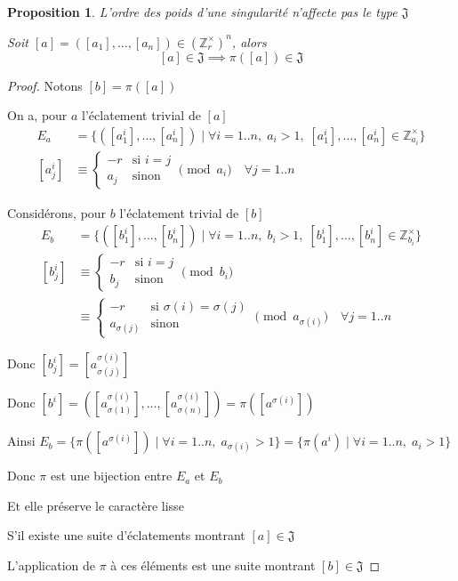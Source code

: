\documentclass{article}
\newtheorem{proposition}{Proposition}
\begin{document}
\begin{proposition}
    L'ordre des poids d'une singularité n'affecte pas le type $\mathfrak{J}$

    Soit $[a]=([a_1], \dots, [a_n]) \in (\mathbb{Z}_r^\times)^n$, alors
    \[ [a] \in \mathfrak{J} \implies \pi([a]) \in \mathfrak{J} \]
\end{proposition}

\begin{proof}
    Notons $[b] = \pi([a])$

    On a, pour $a$ l'éclatement trivial de $[a]$ 
    \begin{align*}
        E_a & = \{ ([a^i_1], \dots, [a^i_n]) \mid \forall i = 1..n,\; a_i > 1,\; [a_1^i], \dots, [a_n^i] \in \mathbb{Z}_{a_i}^\times \} \\
        [a_j^i] &\equiv \begin{cases}
                -r &\text{si } i = j \\
                a_j &\text{sinon}
            \end{cases} \pmod{a_i} \quad \forall j = 1..n
    \end{align*}

    Considérons, pour $b$ l'éclatement trivial de $[b]$
    \begin{align*}
        E_b & = \{ ([b^i_1], \dots, [b^i_n]) \mid \forall i = 1..n,\; b_i > 1,\; [b_1^i], \dots, [b_n^i] \in \mathbb{Z}_{b_i}^\times\} \\
        [b_j^i] & \equiv \begin{cases}
                        -r &\text{si } i = j \\
                        b_j &\text{sinon}
                    \end{cases} \pmod{b_i} \\
            & \equiv \begin{cases}
                -r &\text{si } \sigma(i) = \sigma(j) \\
                a_{\sigma(j)} &\text{sinon}
            \end{cases} \pmod {a_{\sigma(i)}} \quad \forall j = 1..n
    \end{align*}

    Donc $[b_j^i] = [a_{\sigma(j)}^{\sigma(i)}]$

    Donc $[b^i] = ([a_{\sigma(1)}^{\sigma(i)}], \dots, [a_{\sigma(n)}^{\sigma(i)}]) = \pi([a^{\sigma(i)}])$

    Ainsi $E_b = \{ \pi([a^{\sigma(i)}]) \mid \forall i = 1..n,\; a_{\sigma(i)} > 1 \} = \{ \pi(a^i) \mid \forall i = 1..n,\; a_i > 1\}$

    Donc $\pi$ est une bijection entre $E_a$ et $E_b$

    Et elle préserve le caractère lisse

    S'il existe une suite d'éclatements montrant $[a] \in \mathfrak{J}$

    L'application de $\pi$ à ces éléments est une suite montrant $[b] \in \mathfrak{J}$
\end{proof}
\end{document}
